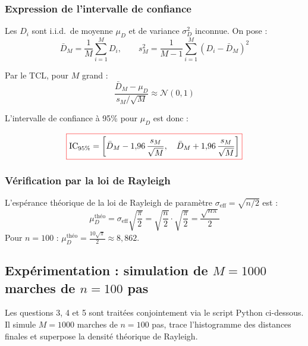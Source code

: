 \documentclass[12pt,a4paper]{report}
\begin{document}
\subsubsection{Expression de l'intervalle de confiance}

Les $D_i$ sont i.i.d.\ de moyenne $\mu_D$ et de variance $\sigma_D^2$ inconnue. On pose :
\[
    \bar{D}_M = \frac{1}{M}\sum_{i=1}^M D_i, \qquad
    s_M^2 = \frac{1}{M-1}\sum_{i=1}^M \left(D_i - \bar{D}_M\right)^2
\]

Par le TCL, pour $M$ grand :
\[
    \frac{\bar{D}_M - \mu_D}{s_M / \sqrt{M}} \approx \mathcal{N}(0,1)
\]

L'intervalle de confiance à 95\% pour $\mu_D$ est donc :

\[
    \fcolorbox{red}{white}{$\displaystyle
        \text{IC}_{95\%} = \left[\bar{D}_M - 1{,}96\,\frac{s_M}{\sqrt{M}},\quad
                                  \bar{D}_M + 1{,}96\,\frac{s_M}{\sqrt{M}}\right]
    $}
\]

\subsubsection{Vérification par la loi de Rayleigh}

L'espérance théorique de la loi de Rayleigh de paramètre $\sigma_\text{eff} = \sqrt{n/2}$ est :
\[
    \mu_D^\text{théo} = \sigma_\text{eff}\sqrt{\frac{\pi}{2}} = \sqrt{\frac{n}{2}} \cdot \sqrt{\frac{\pi}{2}} = \frac{\sqrt{n\pi}}{2}
\]
Pour $n = 100$ : $\mu_D^\text{théo} = \frac{10\sqrt{\pi}}{2} \approx 8{,}862$.

\subsection{Expérimentation : simulation de $M=1000$ marches de $n=100$ pas}

Les questions 3, 4 et 5 sont traitées conjointement via le script Python ci-dessous.
Il simule $M = 1000$ marches de $n = 100$ pas, trace l'histogramme des distances finales
et superpose la densité théorique de Rayleigh.
\end{document}
